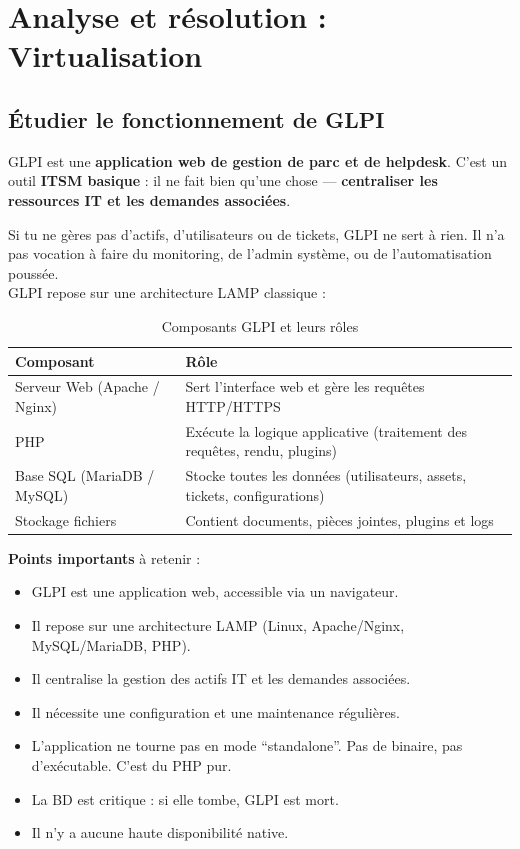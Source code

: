 \newpage

\section*{Analyse et résolution : Virtualisation}

\subsection*{Étudier le fonctionnement de GLPI}
{}
\noindent GLPI est une \textbf{application web de gestion de parc et de helpdesk}. C’est un outil \textbf{ITSM basique} : il ne fait bien qu’une chose — \textbf{centraliser les ressources IT et les demandes associées}.

\noindent Si tu ne gères pas d’actifs, d’utilisateurs ou de tickets, GLPI ne sert à rien. Il n’a pas vocation à faire du monitoring, de l’admin système, ou de l'automatisation poussée. \\

\noindent GLPI repose sur une architecture LAMP classique :
\begin{table}[h]
  \centering
  \small
  \begin{tabular}{|p{}|p{}|}
    \hline
    \textbf{Composant} & \textbf{Rôle} \\ \hline
    Serveur Web (Apache / Nginx) & Sert l’interface web et gère les requêtes HTTP/HTTPS \\ \hline
    PHP & Exécute la logique applicative (traitement des requêtes, rendu, plugins) \\ \hline
    Base SQL (MariaDB / MySQL) & Stocke toutes les données (utilisateurs, assets, tickets, configurations) \\ \hline
    Stockage fichiers & Contient documents, pièces jointes, plugins et logs \\ \hline
  \end{tabular}
  \caption{Composants GLPI et leurs rôles}
\end{table}

\noindent \textbf{Points importants} à retenir :
\begin{itemize}
  \item GLPI est une application web, accessible via un navigateur.
  \item Il repose sur une architecture LAMP (Linux, Apache/Nginx, MySQL/MariaDB, PHP).
  \item Il centralise la gestion des actifs IT et les demandes associées.
  \item Il nécessite une configuration et une maintenance régulières.
  \item L’application ne tourne pas en mode “standalone”. Pas de binaire, pas d’exécutable. C’est du PHP pur.
  \item La BD est critique : si elle tombe, GLPI est mort.
  \item Il n’y a aucune haute disponibilité native.
\end{itemize}

